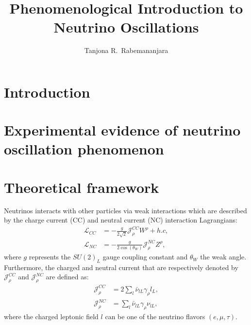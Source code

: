 \documentclass[twocolumn,secnumarabic,amssymb, nobibnotes, aps, prd,10pt]{revtex4-1}
\begin{document}
\title{\texorpdfstring{Phenomenological Introduction to Neutrino Oscillations}{Phenomenological Introduction to Neutrino Oscillations}}

\author{Tanjona R.\ Rabemananjara}

\maketitle

\section{Introduction}



\section{Experimental evidence of neutrino oscillation phenomenon}
\label{sec:experiment}


\section{Theoretical framework}
\label{sec:theory}

Neutrinos interacts with other particles via weak interactions which are described
by the charge current (CC) and neutral current (NC) interaction Lagrangians:
\begin{align}
\mathcal{L}_{CC} &= - \frac{g}{2 \sqrt{2}} \mathcal{J}^{CC}_\rho W^\rho + h.c, \\
\mathcal{L}_{NC} &= - \frac{g}{2 \cos(\theta_W)} \mathcal{J}^{NC}_\rho Z^\rho,
\end{align}
where $g$ represents the $SU(2)_L$ gauge coupling constant and $\theta_W$ the weak
angle. Furthermore, the charged and neutral current that are respectively denoted
by $\mathcal{J}^{CC}_\rho$ and $\mathcal{J}^{NC}_\rho$ are defined as:
\begin{align}
\mathcal{J}^{CC}_\rho &= 2 \sum_{l} \bar{\nu}_{lL} \gamma_\rho l_L, \\
\mathcal{J}^{NC}_\rho &= \sum_{l} \bar{\nu}_{lL} \gamma_\rho \nu_{lL},
\end{align}
where the charged leptonic field $l$ can be one of the neutrino flavors $(e, \mu, \tau)$.
\end{document}
